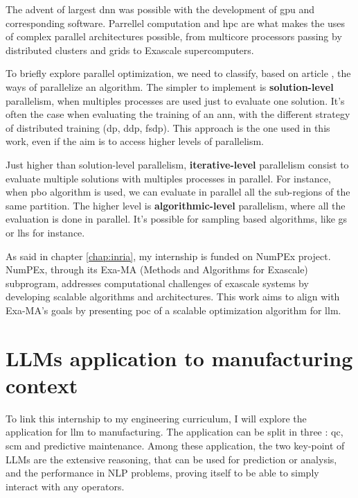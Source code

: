 The advent of largest \acrshort{dnn} was possible with the development of \acrfull{gpu} and corresponding software. Parrellel computation and \acrshort{hpc} are what makes the uses of complex parallel architectures possible, from multicore processors passing by distributed clusters and grids to Exascale supercomputers.

To briefly explore parallel optimization, we need to classify, based on article \cite{kacprzyk_parallel_2015}, the ways of parallelize an algorithm. The simpler to implement is \textbf{solution-level} parallelism, when multiples processes are used just to evaluate one solution. It's often the case when evaluating the training of an \acrshort{ann}, with the different strategy of distributed training (\acrfull{dp}, \acrfull{ddp}, \acrfull{fsdp}). This approach is the one used in this work, even if the aim is to access higher levels of parallelism.

Just higher than solution-level parallelism, \textbf{iterative-level} parallelism consist to evaluate multiple solutions with multiples processes in parallel. For instance, when \acrshort{pbo} algorithm is used, we can evaluate in parallel all the sub-regions of the same partition. The higher level is \textbf{algorithmic-level} parallelism, where all the evaluation is done in parallel. It's possible for sampling based algorithms, like \acrshort{gs} or \acrshort{lhs} for instance.

As said in chapter \ref{chap:inria}, my internship is funded on NumPEx project. NumPEx, through its Exa-MA (Methods and Algorithms for Exascale) subprogram, addresses computational challenges of exascale systems by developing scalable algorithms and architectures. This work aims to align with Exa-MA's goals by presenting \acrlong{poc} of a scalable optimization algorithm for \acrshort{llm}.

\section{LLMs application to manufacturing context}
\label{sec:llm_manufacturing}
To link this internship to my engineering curriculum, I will explore the application for \acrshort{llm} to manufacturing. The application can be split in three : \acrfull{qc}, \acrfull{scm} and predictive maintenance. Among these application, the two key-point of LLMs are the extensive reasoning, that can be used for prediction or analysis, and the performance in NLP problems, proving itself to be able to simply interact with any operators.

